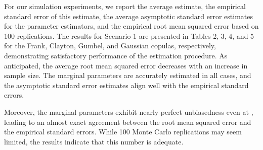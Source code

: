 For our simulation experiments, we report the average estimate, the empirical standard error of this estimate, the average asymptotic standard error estimates for the parameter estimators, and the empirical root mean squared error based on 100 replications. The results for Scenario 1 are presented in Tables 2, 3, 4, and 5 for the Frank, Clayton, Gumbel, and Gaussian copulas, respectively, demonstrating satisfactory performance of the estimation procedure. As anticipated, the average root mean squared error decreases with an increase in sample size. The marginal parameters are accurately estimated in all cases, and the asymptotic standard error estimates align well with the empirical standard errors.

Moreover, the marginal parameters exhibit nearly perfect unbiasedness even at , leading to an almost exact agreement between the root mean squared error and the empirical standard errors. While 100 Monte Carlo replications may seem limited, the results indicate that this number is adequate.

